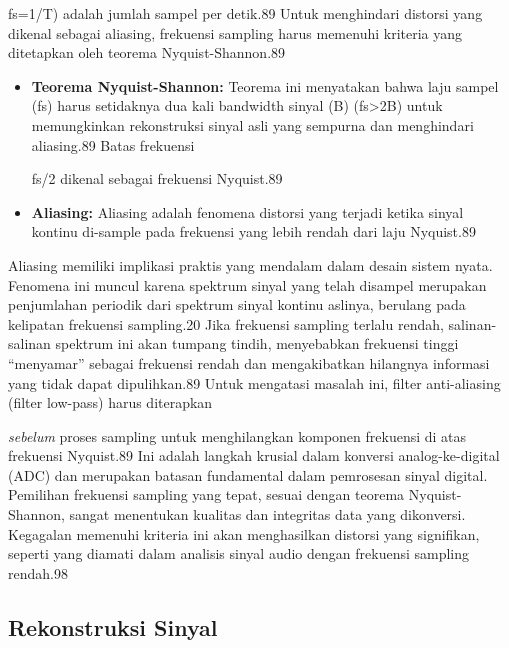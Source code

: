 \documentclass[
  letterpaper,
  DIV=11,
  numbers=noendperiod]{scrreprt}
\begin{document}
fs\hspace{0pt}=1/T) adalah jumlah sampel per detik.89 Untuk menghindari
distorsi yang dikenal sebagai aliasing, frekuensi sampling harus
memenuhi kriteria yang ditetapkan oleh teorema Nyquist-Shannon.89

\begin{itemize}
\item
  \textbf{Teorema Nyquist-Shannon:} Teorema ini menyatakan bahwa laju
  sampel (fs\hspace{0pt}) harus setidaknya dua kali bandwidth sinyal (B)
  (fs\hspace{0pt}\textgreater2B) untuk memungkinkan rekonstruksi sinyal
  asli yang sempurna dan menghindari aliasing.89 Batas frekuensi

  fs\hspace{0pt}/2 dikenal sebagai frekuensi Nyquist.89
\item
  \textbf{Aliasing:} Aliasing adalah fenomena distorsi yang terjadi
  ketika sinyal kontinu di-sample pada frekuensi yang lebih rendah dari
  laju Nyquist.89
\end{itemize}

Aliasing memiliki implikasi praktis yang mendalam dalam desain sistem
nyata. Fenomena ini muncul karena spektrum sinyal yang telah disampel
merupakan penjumlahan periodik dari spektrum sinyal kontinu aslinya,
berulang pada kelipatan frekuensi sampling.20 Jika frekuensi sampling
terlalu rendah, salinan-salinan spektrum ini akan tumpang tindih,
menyebabkan frekuensi tinggi ``menyamar'' sebagai frekuensi rendah dan
mengakibatkan hilangnya informasi yang tidak dapat dipulihkan.89 Untuk
mengatasi masalah ini, filter anti-aliasing (filter low-pass) harus
diterapkan

\emph{sebelum} proses sampling untuk menghilangkan komponen frekuensi di
atas frekuensi Nyquist.89 Ini adalah langkah krusial dalam konversi
analog-ke-digital (ADC) dan merupakan batasan fundamental dalam
pemrosesan sinyal digital. Pemilihan frekuensi sampling yang tepat,
sesuai dengan teorema Nyquist-Shannon, sangat menentukan kualitas dan
integritas data yang dikonversi. Kegagalan memenuhi kriteria ini akan
menghasilkan distorsi yang signifikan, seperti yang diamati dalam
analisis sinyal audio dengan frekuensi sampling rendah.98

\subsection{Rekonstruksi Sinyal}\label{rekonstruksi-sinyal}
\end{document}
